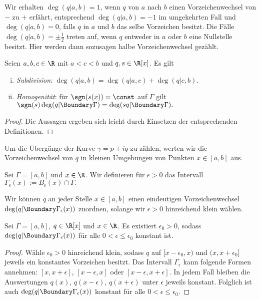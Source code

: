 \documentclass{mythesis}
\begin{document}
Wir erhalten $\deg(q|a,b) = 1$, wenn $q$ von $a$ nach $b$ einen Vorzeichenwechsel von $-$ zu $+$ erfährt, entsprechend $\deg(q|a,b) = -1$ im umgekehrten Fall und $\deg(q|a,b) = 0$, falls $q$ in $a$ und $b$ das selbe Vorzeichen besitzt.
Die Fälle $\deg(q|a,b) = \pm \frac{1}{2}$ treten auf, wenn $q$ entweder in $a$ oder $b$ eine Nullstelle besitzt.
Hier werden dann sozusagen halbe Vorzeichenwechsel gezählt.

\begin{lemma}[Eigenschaften] \label{thm:lem:wn0_prop}
    Seien $a,b,c \in \R$ mit $a < c < b$ und $q, s \in \R[x]$.
    Es gilt
    \begin{enumerate}[i)]
        \item
            \emph{Subdivision}: $\deg(q|a,b) = \deg(q|a,c) + \deg(q|c,b)$.
        \item
            \emph{Homogenität}: für $\sgn(s(x)) = \const$ auf $\Gamma$ gilt
            \begin{math}
                \sgn(s) \deg(q|\Boundary\Gamma) = \deg(sq|\Boundary\Gamma).
            \end{math}
    \end{enumerate}
    \begin{proof}
        Die Aussagen ergeben sich leicht durch Einsetzen der entsprechenden Definitionen.
    \end{proof}
\end{lemma}


Um die Übergänge der Kurve $\gamma = p + iq$ zu zählen, werten wir die Vorzeichenwechsel von $q$ in kleinen Umgebungen von Punkten $x \in [a,b]$ aus.

\begin{definition} \label{thm:def:gamma1_eps}
    Sei $\Gamma = [a,b]$ und $x \in \R$.
    Wir definieren für $\epsilon > 0$ das Intervall
    \begin{math}
        \Gamma_\epsilon(x) := B_\epsilon(x) \cap \Gamma.
    \end{math}
\end{definition}

Wir können $q$ an jeder Stelle $x \in [a,b]$ einen eindeutigen Vorzeichenwechsel $\deg(q|\Boundary\Gamma_\epsilon(x))$ zuordnen, solange wir $\epsilon > 0$ hinreichend klein wählen.

\begin{lemma} \label{thm:lem:wn0_const}
    Sei $\Gamma = [a,b]$, $q \in \R[x]$ und $x \in \R$.
    Es existiert $\epsilon_0 > 0$, sodass $\deg(q|\Boundary\Gamma_\epsilon(x))$ für alle $0 < \epsilon \le \epsilon_0$ konstant ist.
    \begin{proof}
        Wähle $\epsilon_0 > 0$ hinreichend klein, sodass $q$ auf $[x-\epsilon_0, x)$ und $(x, x+\epsilon_0]$ jeweils ein konstantes Vorzeichen besitzt.
        Das Intervall $\Gamma_\epsilon$ kann folgende Formen annehmen: $[x, x+\epsilon]$, $[x-\epsilon, x]$ oder $[x-\epsilon, x+\epsilon]$.
        In jedem Fall bleiben die Auswertungen $q(x)$, $q(x-\epsilon)$, $q(x+\epsilon)$ unter $\epsilon$ jeweils konstant.
        Folglich ist auch $\deg(q|\Boundary\Gamma_\epsilon(x))$ konstant für alle $0 < \epsilon \le \epsilon_0$.
    \end{proof}
\end{lemma}
\end{document}
